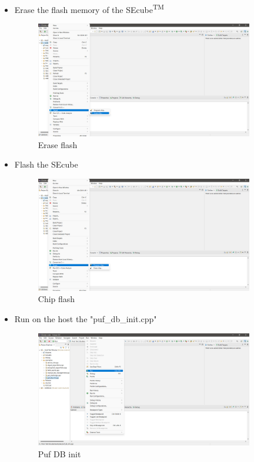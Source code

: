 \begin{itemize}
\item {Erase the flash memory of the SEcube\textsuperscript{TM}}

\begin{figure}[H]
\centering
  \includegraphics[width=9.5cm]{../../images/erase_flash.png}
  \caption{Erase flash}
  \label{fig:Erase flash}
\end{figure}

\item {Flash the SEcube}
\begin{figure}[H]
\centering
  \includegraphics[width=9.5cm]{../../images/chip_flash.png}
  \caption{Chip flash}
  \label{fig:Chip flash}
\end{figure}


\item {Run on the host the "puf\_db\_init.cpp"}
\begin{figure}[H]
\centering
  \includegraphics[width=9.5cm]{../../images/puf_db_init.png}
  \caption{Puf DB init}
  \label{fig:Puf db init}
\end{figure}


\end{itemize}
